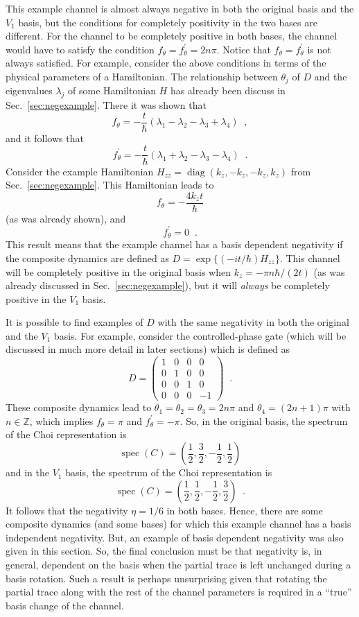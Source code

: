 This example channel is almost always negative in both the original basis and the $V_1$ basis, but the conditions for completely positivity in the two bases are different.  For the channel to be completely positive in both bases, the channel would have to satisfy the condition $f_\theta = f^\prime_\theta = 2n\pi$.  Notice that $f_\theta = f^\prime_\theta$ is not always satisfied.  For example, consider the above conditions in terms of the physical parameters of a Hamiltonian.  The relationship between $\theta_j$ of $D$ and the eigenvalues $\lambda_j$ of some Hamiltonian $H$ has already been discuss in Sec.\ \ref{sec:negexample}.  There it was shown that
$$
f_\theta = -\frac{t}{\hbar}\left(\lambda_1-\lambda_2-\lambda_3+\lambda_4\right)\;\;,
$$
and it follows that
$$
f^\prime_\theta = -\frac{t}{\hbar}\left(\lambda_1+\lambda_2-\lambda_3-\lambda_4\right)\;\;.
$$
Consider the example Hamiltonian $H_{zz} = \operatorname{diag}(k_z,-k_z,-k_z,k_z)$ from Sec.\ \ref{sec:negexample}.  This Hamiltonian leads to
$$
f_\theta = -\frac{4k_z t}{\hbar}
$$
(as was already shown), and
$$
f^\prime_\theta =0\;\;.
$$
This result means that the example channel has a basis dependent negativity if the composite dynamics are defined as $D=\operatorname{exp}\{(-it/\hbar) H_{zz}\}$.  This channel will be completely positive in the original basis when $k_z = -\pi n \hbar/(2t)$ (as was already discussed in Sec.\ \ref{sec:negexample}), but it will {\em always} be completely positive in the $V_1$ basis.

It is possible to find examples of $D$ with the same negativity in both the original and the $V_1$ basis.  For example, consider the controlled-phase gate (which will be discussed in much more detail in later sections) which is defined as
$$
D = \begin{pmatrix}
1&0&0&0\\
0&1&0&0\\
0&0&1&0\\
0&0&0&-1
\end{pmatrix}\;\;.
$$
These composite dynamics lead to $\theta_1 = \theta_2 = \theta_3 = 2n\pi$ and $\theta_4 = (2n+1)\pi$ with $n\in\mathbb{Z}$, which implies $f_\theta = \pi$ and $f^\prime_\theta = -\pi$.  So, in the original basis, the spectrum of the Choi representation is
$$
\operatorname{spec}\left(C\right) = \left( \frac{1}{2}, \frac{3}{2}, -\frac{1}{2}, \frac{1}{2}\right)
$$  
and in the $V_1$ basis, the spectrum of the Choi representation is
$$
\operatorname{spec}\left(C\right) = \left( \frac{1}{2}, \frac{1}{2}, -\frac{1}{2}, \frac{3}{2}\right)\;\;.
$$  
It follows that the negativity $\eta=1/6$ in both bases.  Hence, there are some composite dynamics (and some bases) for which this example channel has a basis independent negativity.  But, an example of basis dependent negativity was also given in this section.  So, the final conclusion must be that negativity is, in general, dependent on the basis when the partial trace is left unchanged during a basis rotation.  Such a result is perhaps unsurprising given that rotating the partial trace along with the rest of the channel parameters is required in a ``true'' basis change of the channel.


